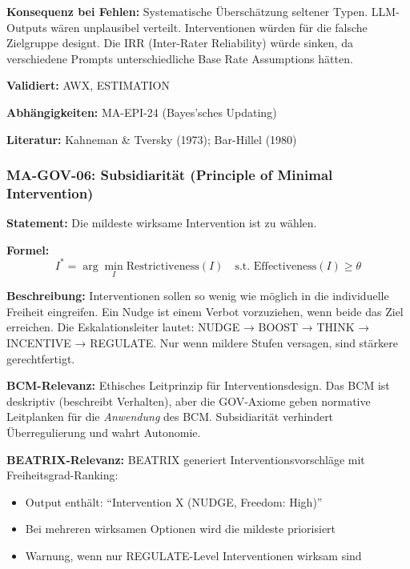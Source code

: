 \textbf{Konsequenz bei Fehlen:}
Systematische Überschätzung seltener Typen. LLM-Outputs wären unplausibel verteilt. Interventionen würden für die falsche Zielgruppe designt. Die IRR (Inter-Rater Reliability) würde sinken, da verschiedene Prompts unterschiedliche Base Rate Assumptions hätten.

\textbf{Validiert:} AWX, ESTIMATION

\textbf{Abhängigkeiten:} MA-EPI-24 (Bayes'sches Updating)

\textbf{Literatur:} Kahneman \& Tversky (1973); Bar-Hillel (1980)


\subsubsection*{MA-GOV-06: Subsidiarität (Principle of Minimal Intervention)}

\textbf{Statement:} Die mildeste wirksame Intervention ist zu wählen.

\textbf{Formel:}
\begin{equation}
I^* = \arg\min_{I} \text{Restrictiveness}(I) \quad \text{s.t. } \text{Effectiveness}(I) \geq \theta
\end{equation}

\textbf{Beschreibung:}
Interventionen sollen so wenig wie möglich in die individuelle Freiheit eingreifen. Ein Nudge ist einem Verbot vorzuziehen, wenn beide das Ziel erreichen. Die Eskalationsleiter lautet: NUDGE → BOOST → THINK → INCENTIVE → REGULATE. Nur wenn mildere Stufen versagen, sind stärkere gerechtfertigt.

\textbf{BCM-Relevanz:}
Ethisches Leitprinzip für Interventionsdesign. Das BCM ist deskriptiv (beschreibt Verhalten), aber die GOV-Axiome geben normative Leitplanken für die \textit{Anwendung} des BCM. Subsidiarität verhindert Überregulierung und wahrt Autonomie.

\textbf{BEATRIX-Relevanz:}
BEATRIX generiert Interventionsvorschläge mit Freiheitsgrad-Ranking:
\begin{itemize}
    \item Output enthält: ``Intervention X (NUDGE, Freedom: High)''
    \item Bei mehreren wirksamen Optionen wird die mildeste priorisiert
    \item Warnung, wenn nur REGULATE-Level Interventionen wirksam sind
\end{itemize}


